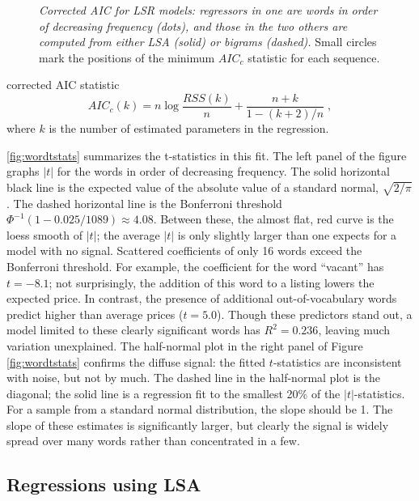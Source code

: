 \documentclass[12pt]{article}
\begin{document}
\begin{figure}
\caption{  \label{fig:aic}  
  {\sl Corrected AIC for LSR models: regressors in one are words in order of
 decreasing frequency (dots), and those in the two others are computed from either
 LSA (solid) or bigrams (dashed).}  Small circles mark the positions of the
 minimum $AIC_c$ statistic for each sequence.}  
\end{figure}

 
 corrected AIC statistic \citep{hurvich89}
 \begin{equation}
    AIC_{c}(k) = n \log \frac{RSS(k)}{n} + \frac{n+k}{1-(k+2)/n} \;,
 \end{equation}
 where $k$ is the number of estimated parameters in the regression.  

 \ref{fig:wordtstats} summarizes the t-statistics in this fit. The left panel of
 the figure graphs $|t|$ for the words in order of decreasing frequency.  The
 solid horizontal black line is the expected value of the absolute value of a
 standard normal, $\sqrt{2/\pi}$. The dashed horizontal line is the Bonferroni
 threshold $\Phi^{-1}(1-0.025/1089) \approx 4.08$.  Between these, the almost
 flat, red curve is the loess smooth of $|t|$; the average $|t|$ is only slightly
 larger than one expects for a model with no signal.  Scattered coefficients of
 only 16 words exceed the Bonferroni threshold.  For example, the coefficient
 for the word ``vacant'' has $t=-8.1$; not surprisingly, the addition of this
 word to a listing lowers the expected price.  In contrast, the presence of
 additional out-of-vocabulary words predict higher than average prices
 ($t=5.0$).  Though these predictors stand out, a model limited to these clearly
 significant words has $R^2 = 0.236$, leaving much variation unexplained.  The
 half-normal plot in the right panel of Figure \ref{fig:wordtstats} confirms the
 diffuse signal: the fitted $t$-statistics are inconsistent with noise, but not
 by much.  The dashed line in the half-normal plot is the diagonal; the solid line
 is a regression fit to the smallest 20\% of the $|t|$-statistics.  For a sample
 from a standard normal distribution, the slope should be 1.  The slope of these
 estimates is significantly larger, but clearly the signal is widely spread over
 many words rather than concentrated in a few.
   

 \subsection{ Regressions using LSA }  %
 \label{sec:regrUsingLSA}
 
\end{document}
